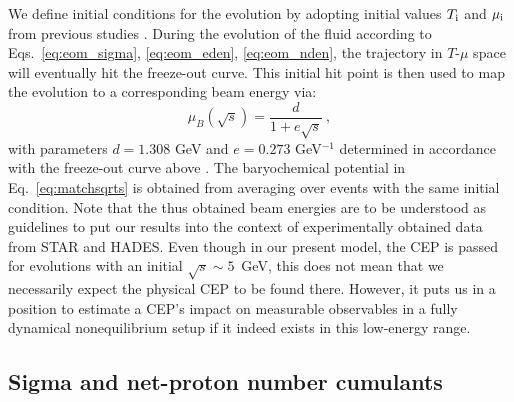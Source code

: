 \documentclass[%
 reprint,
 amsmath,amssymb,
 aps,
]{revtex4-2}
\begin{document}
We define initial conditions for the evolution by adopting initial values $T_{\rm i}$ and $\mu_{\rm i}$ from previous studies \cite{Herold:2018ptm}. During the evolution of the fluid according to Eqs.~\eqref{eq:eom_sigma}, \eqref{eq:eom_eden}, \eqref{eq:eom_nden}, the trajectory in $T$-$\mu$ space will eventually hit the freeze-out curve. This initial hit point is then used to map the evolution to a corresponding beam energy via:
    \begin{equation}
    \label{eq:matchsqrts}
    \mu_B(\sqrt{s}) = \frac{d}{1 + e\sqrt{s}}~,
    \end{equation}
with parameters $d = 1.308$ GeV and  $e = 0.273$ GeV$^{-1}$ determined in accordance with the freeze-out curve above \cite{Cleymans:2005xv}. The baryochemical potential in Eq.~\eqref{eq:matchsqrts} is obtained from averaging over events with the same initial condition. Note that the thus obtained beam energies are to be understood as guidelines to put our results into the context of experimentally obtained data from STAR and HADES. Even though in our present model, the CEP is passed for evolutions with an initial $\sqrt{s}\sim 5$~GeV, this does not mean that we necessarily expect the physical CEP to be found there. However, it puts us in a position to estimate a CEP's impact on measurable observables in a fully dynamical nonequilibrium setup if it indeed exists in this low-energy range.   


\subsection{Sigma and net-proton number cumulants}
\end{document}

